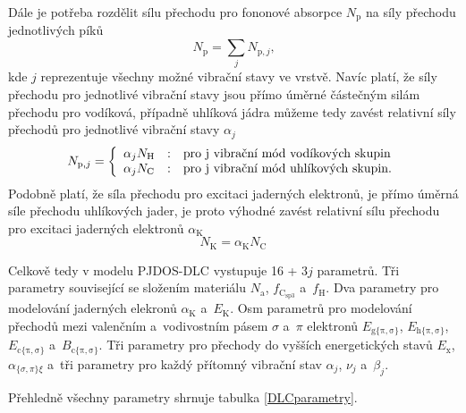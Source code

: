 Dále je potřeba rozdělit sílu přechodu pro fononové absorpce $N_\mathrm{p}$ na síly přechodu jednotlivých píků
\begin{equation}
N_\mathrm{p} = \sum_j N_{\mathrm{p},j} \text{,}
\end{equation}
kde $j$ reprezentuje všechny možné vibrační stavy ve vrstvě. Navíc platí, že síly přechodu pro jednotlivé vibrační stavy jsou přímo úměrné částečným silám přechodu pro vodíková, případně uhlíková jádra můžeme tedy zavést relativní síly přechodů pro jednotlivé vibrační stavy $\alpha_j$
\begin{equation}
N_{\mathrm{p},j} = 
	\left\{\begin{array}{l c l} 
	\alpha_j N_\mathrm{H} & : & \text{pro j vibrační mód vodíkových skupin} \\
	\alpha_j N_\mathrm{C} & : & \text{pro j vibrační mód uhlíkových skupin.}\end{array} \right.
\end{equation}
Podobně platí, že síla přechodu pro excitaci jaderných elektronů, je přímo úměrná síle přechodu uhlíkových jader, je proto výhodné zavést relativní sílu přechodu pro excitaci jaderných elektronů $\alpha_\mathrm{K}$
\begin{equation}
N_\mathrm{K} =  \alpha_\mathrm{K} N_\mathrm{C}
\end{equation}

Celkově tedy v modelu PJDOS-DLC vystupuje 16 + 3$j$ parametrů. Tři parametry související se složením materiálu $N_\mathrm{a}$, $f_\mathrm{C_{sp3}}$ a~$f_\mathrm{H}$. Dva parametry pro modelování jaderných elekronů $\alpha_\mathrm{K}$ a~$E_\mathrm{K}$. Osm parametrů pro modelování přechodů mezi valenčním a~vodivostním pásem $\sigma$ a~$\pi$ elektronů $E_\mathrm{g\{\pi,\sigma\}}$, $E_\mathrm{h\{\pi,\sigma\}}$, $E_\mathrm{c\{\pi,\sigma\}}$ a~$B_\mathrm{c\{\pi,\sigma\}}$. Tři parametry pro přechody do vyšších energetických stavů $E_\mathrm{x}$, $\alpha_{\{\sigma,\pi\}\xi}$ a~tři parametry pro každý přítomný vibrační stav $\alpha_j$, $\nu_j$ a~$\beta_j$.

Přehledně všechny parametry shrnuje tabulka \ref{DLCparametry}.

